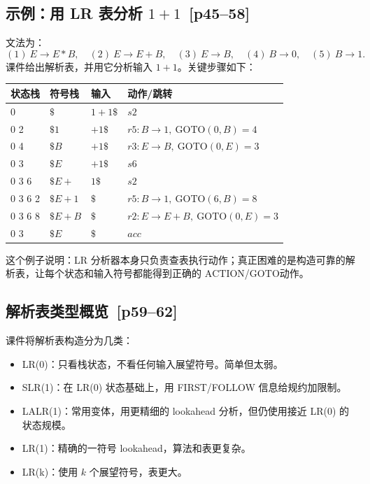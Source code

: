 \documentclass[UTF8,fontset=none,11pt]{ctexart}
\newcommand{\pg}[1]{\texorpdfstring{{\small\color{graytext}\,[p#1]}}{ [p#1]}}
\newcommand{\ACTION}{\ensuremath{\mathrm{ACTION}}}
\newcommand{\GOTO}{\ensuremath{\mathrm{GOTO}}}
\begin{document}
\subsection{示例：用 LR 表分析 \texorpdfstring{\(1+1\)}{1+1} \pg{45--58}}

文法为：
\[
(1)\ E\to E*B,\quad
(2)\ E\to E+B,\quad
(3)\ E\to B,\quad
(4)\ B\to 0,\quad
(5)\ B\to 1.
\]
课件给出解析表，并用它分析输入 \(1+1\)。关键步骤如下：

\begin{center}
\small
\begin{tabular}{llll}
\toprule
状态栈 & 符号栈 & 输入 & 动作/跳转 \\
\midrule
0 & \(\$\) & \(1+1\$\) & \(s2\) \\
0 2 & \(\$1\) & \(+1\$\) & \(r5: B\to 1,\ \GOTO(0,B)=4\) \\
0 4 & \(\$B\) & \(+1\$\) & \(r3: E\to B,\ \GOTO(0,E)=3\) \\
0 3 & \(\$E\) & \(+1\$\) & \(s6\) \\
0 3 6 & \(\$E+\) & \(1\$\) & \(s2\) \\
0 3 6 2 & \(\$E+1\) & \(\$\) & \(r5: B\to 1,\ \GOTO(6,B)=8\) \\
0 3 6 8 & \(\$E+B\) & \(\$\) & \(r2: E\to E+B,\ \GOTO(0,E)=3\) \\
0 3 & \(\$E\) & \(\$\) & \(acc\) \\
\bottomrule
\end{tabular}
\end{center}

这个例子说明：LR 分析器本身只负责查表执行动作；真正困难的是构造可靠的解析表，让每个状态和输入符号都能得到正确的 \ACTION/\GOTO 动作。

\subsection{解析表类型概览 \pg{59--62}}

课件将解析表构造分为几类：

\begin{itemize}
  \item LR(0)：只看栈状态，不看任何输入展望符号。简单但太弱。
  \item SLR(1)：在 LR(0) 状态基础上，用 FIRST/FOLLOW 信息给规约加限制。
  \item LALR(1)：常用变体，用更精细的 lookahead 分析，但仍使用接近 LR(0) 的状态规模。
  \item LR(1)：精确的一符号 lookahead，算法和表更复杂。
  \item LR(k)：使用 \(k\) 个展望符号，表更大。
\end{itemize}
\end{document}
